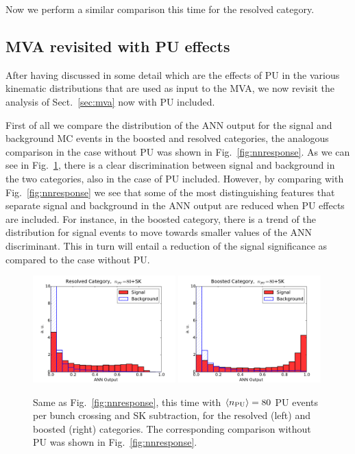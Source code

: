 Now we perform a similar comparison this time for
the resolved category.


\subsection{MVA revisited with PU effects}

After having discussed in some detail which are the effects
of PU in the various kinematic distributions that are used
as input to the MVA, we now revisit the analysis
of Sect.~\ref{sec:mva} now with PU included.


First of all we compare the distribution of the ANN output for the
signal and background MC events in the boosted and resolved categories,
the analogous comparison in the case without PU was shown
in Fig.~\ref{fig:nnresponse}.
%
As we can see in Fig.~\ref{fig:nnresponse_PU}, there is a clear discrimination
between signal and background in the two categories, also
in the case of PU included.
%
However, by comparing with Fig.~\ref{fig:nnresponse} we see
that some of the most distinguishing features that separate signal
and background in the ANN output are reduced when PU effects
are included.
%
For instance, in the boosted category, there is a trend of the distribution
for signal events to move towards smaller values of the
ANN discriminant.
%
This in turn will entail a reduction of the signal significance as
compared to the case without PU.

\begin{figure}[t]
  \begin{center}
\includegraphics[width=0.49\textwidth]{plots/Resolved_disc_SKPU80.pdf}
\includegraphics[width=0.49\textwidth]{plots/Boosted_disc_SKPU80.pdf}
\caption{\small Same as Fig.~\ref{fig:nnresponse},
  this time with $\left\langle n_{\rm PU}\right\rangle=80$ PU events per bunch crossing
  and SK subtraction, for the resolved (left) and boosted
  (right) categories.
  The corresponding comparison without PU was shown in
  Fig.~\ref{fig:nnresponse}.
}
\label{fig:nnresponse_PU}
\end{center}
\end{figure}

